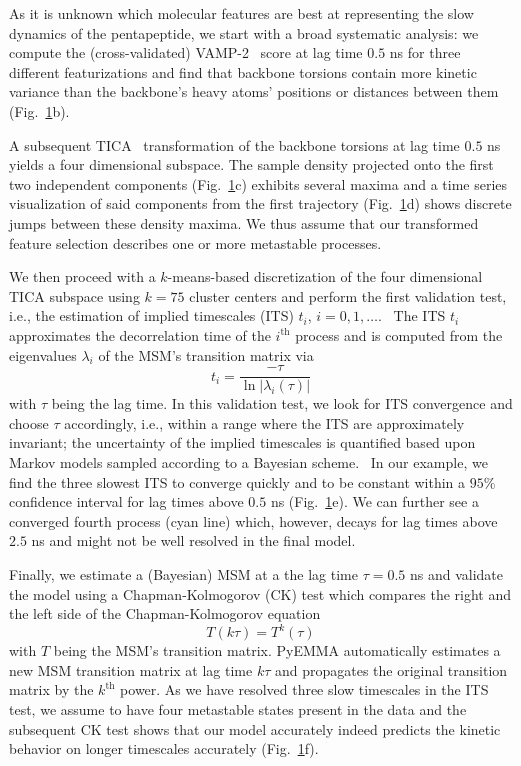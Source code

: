\documentclass[9pt,tutorial]{livecoms}
\begin{document}
\begin{figure}
\label{fig:io-to-ck}
\end{figure}

As it is unknown which molecular features are best at representing the slow dynamics of the pentapeptide, we start with a broad systematic analysis: we compute the (cross-validated) VAMP-2~\cite{vamp-preprint} score at lag time $0.5$ ns for three different featurizations and find that backbone torsions contain more kinetic variance than the backbone's heavy atoms' positions or distances between them (Fig.~\ref{fig:io-to-ck}b).

A subsequent TICA~\cite{tica,kinetic-maps} transformation of the backbone torsions at lag time $0.5$ ns yields a four dimensional subspace. The sample density projected onto the first two independent components (Fig.~\ref{fig:io-to-ck}c) exhibits several maxima and a time series visualization of said components from the first trajectory (Fig.~\ref{fig:io-to-ck}d) shows discrete jumps between these density maxima. We thus assume that our transformed feature selection describes one or more metastable processes.

We then proceed with a $k$-means-based discretization of the four dimensional TICA subspace using $k=75$ cluster centers and perform the first validation test, i.e., the estimation of implied timescales (ITS) $t_i$, $i=0, 1,\dots$.~\cite{swope-its} The ITS $t_i$ approximates the decorrelation time of the $i^\textrm{th}$ process and is computed from the eigenvalues $\lambda_i$ of the MSM's transition matrix via
\begin{equation}
\label{eq:its}
t_i = \frac{-\tau}{\ln\left|\lambda_i(\tau)\right|}
\end{equation}
with $\tau$ being the lag time. In this validation test, we look for ITS convergence and choose $\tau$ accordingly, i.e., within a range where the ITS are approximately invariant; the uncertainty of the implied timescales is quantified based upon Markov models sampled according to a Bayesian scheme.~\cite{noe-tmat-sampling} In our example, we find the three slowest ITS to converge quickly and to be constant within a $95\%$ confidence interval for lag times above $0.5$ ns (Fig.~\ref{fig:io-to-ck}e). We can further see a converged fourth process (cyan line) which, however, decays for lag times above $2.5$ ns and might not be well resolved in the final model.

Finally, we estimate a (Bayesian) MSM at a the lag time $\tau=0.5$ ns and validate the model using a Chapman-Kolmogorov (CK) test which compares the right and the left side of the Chapman-Kolmogorov equation
\begin{equation}
\label{eq:ck}
T(k \tau) = T^k(\tau)
\end{equation}
with $T$ being the MSM's transition matrix. PyEMMA automatically estimates a new MSM transition matrix at lag time $k \tau$ and propagates the original transition matrix by the $k^\textrm{th}$ power. As we have resolved three slow timescales in the ITS test, we assume to have four metastable states present in the data and the subsequent CK test shows that our model accurately indeed predicts the kinetic behavior on longer timescales accurately (Fig.~\ref{fig:io-to-ck}f).
\end{document}
